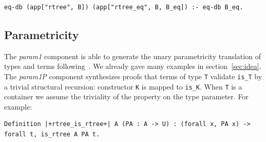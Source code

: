 \documentclass[a4paper,UKenglish,cleveref, autoref]{lipics-v2019}
\newcommand{\derive}[1]{\emph{#1}}
\begin{document}
\begin{lstlisting}[]
eq-db (app["rtree", B]) (app["rtree_eq", B, B_eq]) :- eq-db B_eq.
\end{lstlisting}


% 
% 

\subsection{Parametricity} %

The \derive{param1} component is able to generate the unary
parametricity translation of types and terms
following~\cite{keller:hal-00730913}. We already gave many
examples in section~\ref{sec:idea}.
% 
% 
The \derive{param1P} component synthesizes proofs that terms
of type \lstinline+T+ validate \lstinline+is_T+ by a trivial
structural recursion: constructor \lstinline+K+ is mapped
to \lstinline+is_K+. When \lstinline+T+ is a container we
assume the triviality of the property on the type parameter.
For example:

\begin{lstlisting}
Definition |+rtree_is_rtree+| A (PA : A -> U) : (forall x, PA x) -> forall t, is_rtree A PA t.
\end{lstlisting}

\end{document}
